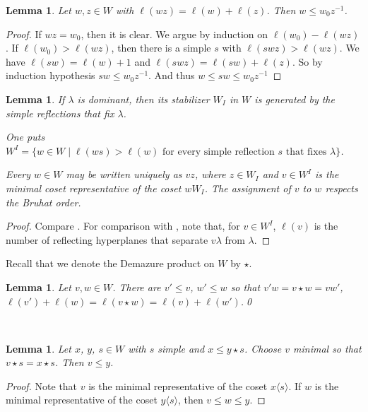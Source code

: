 \documentclass[sn-mathphys-num]{sn-jnl}%
\newtheorem{lemma}[theorem]{Lemma}
\theoremstyle{definition}
\begin{document}
\begin{lemma}\label{lem:in w0}
Let $w,z\in W$ with $\ell(wz)=\ell(w)+\ell(z)$. Then $w\leq w_0z^{-1}$.
\end{lemma}
\begin{proof}
If $wz=w_0$, then it is clear. We argue by induction on $\ell(w_0)-\ell(wz)$.
If $\ell(w_0)>\ell(wz)$, then there is a simple $s$ with $\ell(swz)>\ell(wz)$.
We have $\ell(sw)=\ell(w)+1$ and $\ell(swz)=\ell(sw)+\ell(z)$. So by induction
hypothesis $sw\leq w_0z^{-1}$. And thus $w\leq sw\leq w_0z^{-1}$
\end{proof}


\begin{lemma}\label{lem:minimal-coset-representative}
If $\lambda$ is dominant, then its stabilizer $W_I$ in $W$ is generated by the simple reflections that fix $\lambda$. 

One puts $W^I=\{w\in W\mid \ell(ws)>\ell(w) \mbox{ for every simple reflection $s$ that fixes }\lambda\}$.

Every $w\in W$ may be written uniquely as $vz$, where $z\in W_I$ and $v\in W^I$ is the minimal coset representative of the coset $wW_I$. The assignment of $v$ to $w$ respects the Bruhat order.

\end{lemma}
\begin{proof}Compare  \cite[1.10, 1.15]{Humphreys}. For comparison with \cite[Section 3]{Ana}, note that, for $v\in W^I$, $\ell(v)$ is the number of reflecting hyperplanes that separate $v\lambda$ from $\lambda$.
\end{proof}



Recall that we denote the Demazure product on $W $ by $\star$.
 \begin{lemma}
 Let $v,w\in W$. There are $v'\leq v$, $w'\leq w$ so that $v'w=v\star w=vw'$,
$ \ell(v')+\ell(w)=\ell(v\star w)=\ell(v)+\ell(w')$.\qed
 \end{lemma}

\

\begin{lemma}\label{lem:caps}
Let $x$, $y$, $s\in W$ with $s$ simple and $x\leq y\star s$. Choose $v$ minimal so that $v\star s= x\star s$.
Then $v\leq y$.
\end{lemma}
\begin{proof}
Note that $v$ is the minimal representative of the coset $x\langle s\rangle$. If $w$ is the 
minimal representative of the coset $y\langle s\rangle$, then $v\leq w\leq y$.
\end{proof}
\end{document}

